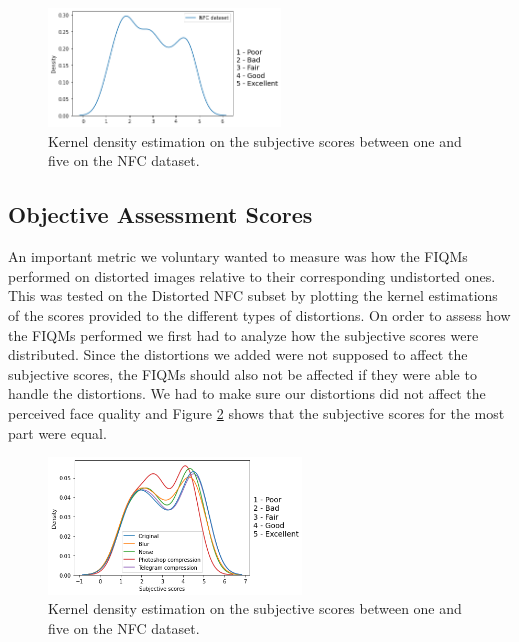 \begin{figure}[h]
    \centering
    \includegraphics[width=0.55\textwidth]{figures/KernelPlotsNFC.png}
    \caption{Kernel density estimation on the subjective scores between one and five on the NFC dataset.}
    \label{fig:NFCKernel}
\end{figure}


\subsection{Objective Assessment Scores}
An important metric we voluntary wanted to measure was how the FIQMs performed on distorted images relative to their corresponding undistorted ones. This was tested on the Distorted NFC subset by plotting the kernel estimations of the scores provided to the different types of distortions. 
On order to assess how the FIQMs performed we first had to analyze how the subjective scores were distributed. Since the distortions we added were not supposed to affect the subjective scores, the FIQMs should also not be affected if they were able to handle the distortions. We had to make sure our distortions did not affect the perceived face quality and Figure \ref{fig:NFC2KernelSUB} shows that the subjective scores for the most part were equal.

\begin{figure}[h]
    \centering
    \includegraphics[width=0.6\textwidth]{figures/KernelPlotsSUBJECTIVE.png}
    \caption{Kernel density estimation on the subjective scores between one and five on the NFC dataset.}
    \label{fig:NFC2KernelSUB}
\end{figure}

